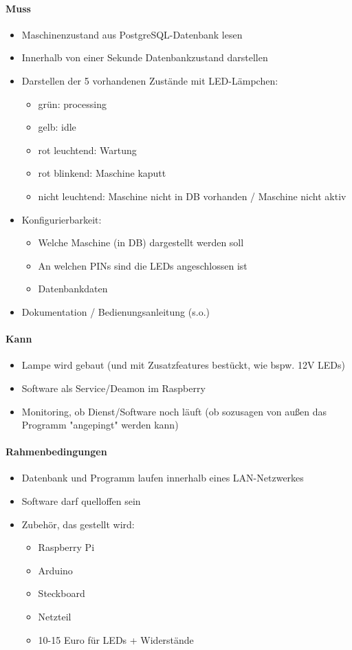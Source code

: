 \documentclass{scrartcl}
\begin{document}
\paragraph{Muss}
\begin{itemize}
\item Maschinenzustand aus PostgreSQL-Datenbank lesen
\item Innerhalb von einer Sekunde Datenbankzustand darstellen
\item Darstellen der 5 vorhandenen Zustände mit LED-Lämpchen:
\begin{itemize}
\item grün: processing
\item gelb: idle
\item rot leuchtend: Wartung
\item rot blinkend: Maschine kaputt
\item nicht leuchtend: Maschine nicht in DB vorhanden / Maschine nicht aktiv
\end{itemize}
\item Konfigurierbarkeit:
\begin{itemize}
\item Welche Maschine (in DB) dargestellt werden soll
\item An welchen PINs sind die LEDs angeschlossen ist
\item Datenbankdaten
\end{itemize}
\item Dokumentation / Bedienungsanleitung (s.o.)
\end{itemize}
\paragraph{Kann}
\begin{itemize}
\item Lampe wird gebaut (und mit Zusatzfeatures bestückt, wie bspw. 12V LEDs)
\item Software als Service/Deamon im Raspberry
\item Monitoring, ob Dienst/Software noch läuft (ob sozusagen von außen das Programm "angepingt" werden kann)
\end{itemize}
\paragraph{Rahmenbedingungen}
\begin{itemize}
\item Datenbank und Programm laufen innerhalb eines LAN-Netzwerkes
\item Software darf quelloffen sein
\item Zubehör, das gestellt wird:
\begin{itemize}
\item Raspberry Pi
\item Arduino
\item Steckboard
\item Netzteil
\item 10-15 Euro für LEDs + Widerstände
\end{itemize}
\end{itemize}
\end{document}

